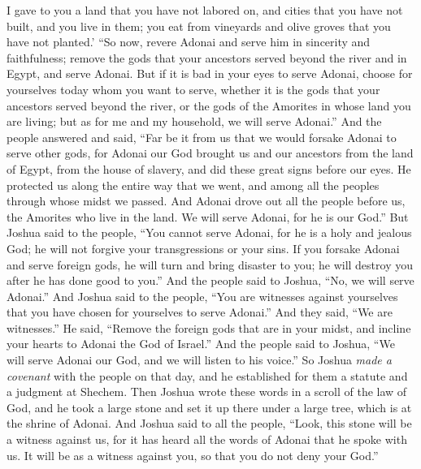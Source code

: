 \begin{biblechapter}
\verse I gave to you a land that you have not labored on, and cities that you have not built, and you live in them; you eat from vineyards and olive groves that you have not planted.’
 “So now, revere Adonai and serve him in sincerity and faithfulness; remove the gods that your ancestors served beyond the river and in Egypt, and serve Adonai.
\verse But if it is bad in your eyes to serve Adonai, choose for yourselves today whom you want to serve, whether it is the gods that your ancestors served beyond the river, or the gods of the Amorites in whose land you are living; but as for me and my household, we will serve Adonai.”
\verse And the people answered and said, “Far be it from us that we would forsake Adonai to serve other gods,
\verse for Adonai our God brought us and our ancestors from the land of Egypt, from the house of slavery, and did these great signs before our eyes. He protected us along the entire way that we went, and among all the peoples through whose midst we passed.
\verse And Adonai drove out all the people before us, the Amorites who live in the land. We will serve Adonai, for he is our God.”
\verse But Joshua said to the people, “You cannot serve Adonai, for he is a holy and jealous God; he will not forgive your transgressions or your sins.
\verse If you forsake Adonai and serve foreign gods, he will turn and bring disaster to you; he will destroy you after he has done good to you.”
\verse And the people said to Joshua, “No, we will serve Adonai.”
\verse And Joshua said to the people, “You are witnesses against yourselves that you have chosen for yourselves to serve Adonai.” And they said, “We are witnesses.”
\verse He said, “Remove the foreign gods that are in your midst, and incline your hearts to Adonai the God of Israel.”
\verse And the people said to Joshua, “We will serve Adonai our God, and we will listen to his voice.”
\verse So Joshua \textit{made a covenant} with the people on that day, and he established for them a statute and a judgment at Shechem.
\verse Then Joshua wrote these words in a scroll of the law of God, and he took a large stone and set it up there under a large tree, which is at the shrine of Adonai.
\verse And Joshua said to all the people, “Look, this stone will be a witness against us, for it has heard all the words of Adonai that he spoke with us. It will be as a witness against you, so that you do not deny your God.”

\end{biblechapter}
